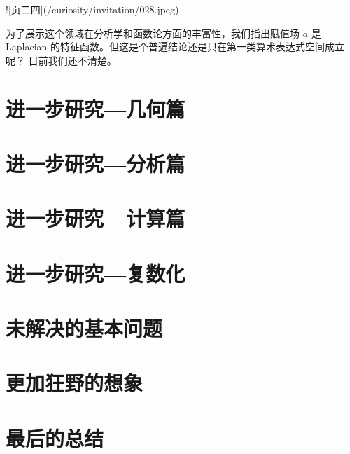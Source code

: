 \documentclass[a4paper,12pt]{book}
\numberwithin{problem}{section}
\numberwithin{definition}{section}
\numberwithin{lemma}{section}
\numberwithin{proposition}{section}
\numberwithin{theorem}{section}
\numberwithin{grammar}{section}
\numberwithin{program}{section}
\numberwithin{convention}{section}
\numberwithin{corollary}{section}
\begin{document}
![页二四](/curiosity/invitation/028.jpeg)

为了展示这个领域在分析学和函数论方面的丰富性，我们指出赋值场 $a$ 是 Laplacian 的特征函数。但这是个普遍结论还是只在第一类算术表达式空间成立呢？
目前我们还不清楚。

\newpage

\chapter{进一步研究—几何篇}

\newpage

\chapter{进一步研究—分析篇}

\newpage

\chapter{进一步研究—计算篇}

\newpage

\chapter{进一步研究—复数化}

\newpage

\chapter{未解决的基本问题}

\newpage

\chapter{更加狂野的想象}

\newpage

\chapter{最后的总结}
\end{document}
